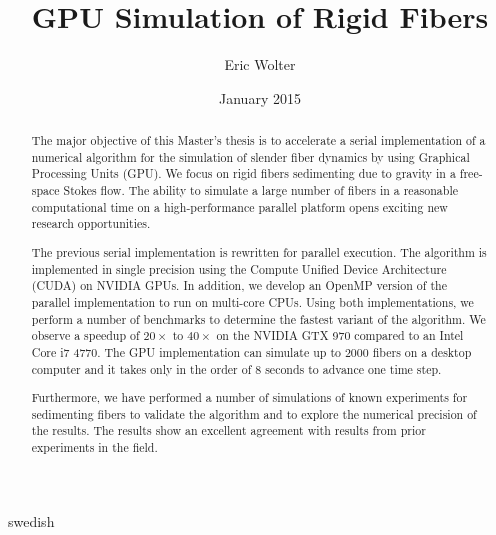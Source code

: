 \documentclass[a4paper,11pt]{kth-mag}
\title{GPU Simulation of Rigid Fibers}
\author{Eric Wolter}
\date{January 2015}
\begin{document}
\frontmatter
\pagestyle{empty}

\maketitle
{}
\begin{abstract}
The major objective of this Master's thesis is to accelerate a serial implementation of a numerical algorithm for the simulation of slender fiber dynamics by using Graphical Processing Units (GPU). We focus on rigid fibers sedimenting due to gravity in a free-space Stokes flow. The ability to simulate a large number of fibers in a reasonable computational time on a high-performance parallel platform opens exciting new research opportunities.

The previous serial implementation is rewritten for parallel execution. The algorithm is implemented in single precision using the Compute Unified Device Architecture (CUDA) on NVIDIA GPUs. In addition, we develop an OpenMP version of the parallel implementation to run on multi-core CPUs. Using both implementations, we perform a number of benchmarks to determine the fastest variant of the algorithm. We observe a speedup of $20×$ to $40×$ on the NVIDIA GTX 970 compared to an Intel Core i7 4770. The GPU implementation can simulate up to $2000$ fibers on a desktop computer and it takes only in the order of $8$ seconds to advance one time step.

Furthermore, we have performed a number of simulations of known experiments for sedimenting fibers to validate the algorithm and to explore the numerical precision of the results. The results show an excellent agreement with results from prior experiments in the field.
\end{abstract}

\clearpage


\begin{foreignabstract}{swedish}

\end{foreignabstract}

\clearpage

\tableofcontents*

\clearpage

\listoffigures
\clearpage

\listoftables
\clearpage

\listoflistings
\clearpage

\mainmatter
\pagestyle{newchap}
\end{document}
